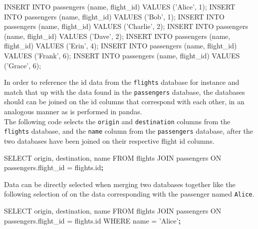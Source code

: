 \documentclass[]{book}
\newenvironment{Shaded}{\begin{snugshade}}{\end{snugshade}}
\newcommand{\ExtensionTok}[1]{#1}
\newcommand{\KeywordTok}[1]{\textcolor[rgb]{0.13,0.29,0.53}{\textbf{#1}}}
\newcommand{\NormalTok}[1]{#1}
\newcommand{\StringTok}[1]{\textcolor[rgb]{0.31,0.60,0.02}{#1}}
\begin{document}
\begin{Shaded}
\begin{Highlighting}[]
\ExtensionTok{INSERT}\NormalTok{ INTO passengers (name, flight_id) }\ExtensionTok{VALUES}\NormalTok{ (}\StringTok{'Alice'}\NormalTok{, 1);  }
\ExtensionTok{INSERT}\NormalTok{ INTO passengers (name, flight_id) }\ExtensionTok{VALUES}\NormalTok{ (}\StringTok{'Bob'}\NormalTok{, 1);    }
\ExtensionTok{INSERT}\NormalTok{ INTO passengers (name, flight_id) }\ExtensionTok{VALUES}\NormalTok{ (}\StringTok{'Charlie'}\NormalTok{, 2);}
\ExtensionTok{INSERT}\NormalTok{ INTO passengers (name, flight_id) }\ExtensionTok{VALUES}\NormalTok{ (}\StringTok{'Dave'}\NormalTok{, 2);   }
\ExtensionTok{INSERT}\NormalTok{ INTO passengers (name, flight_id) }\ExtensionTok{VALUES}\NormalTok{ (}\StringTok{'Erin'}\NormalTok{, 4);   }
\ExtensionTok{INSERT}\NormalTok{ INTO passengers (name, flight_id) }\ExtensionTok{VALUES}\NormalTok{ (}\StringTok{'Frank'}\NormalTok{, 6);  }
\ExtensionTok{INSERT}\NormalTok{ INTO passengers (name, flight_id) }\ExtensionTok{VALUES}\NormalTok{ (}\StringTok{'Grace'}\NormalTok{, 6);  }
\end{Highlighting}
\end{Shaded}

In order to reference the id data from the \texttt{flights} database for instance and match that up with the data found in the \texttt{passengers} database, the databases should can be joined on the id columns that correspond with each other, in an analogous manner as is performed in pandas.\\
The following code selects the \texttt{origin} and \texttt{destination} columns from the \texttt{flights} database, and the \texttt{name} column from the \texttt{passengers} database, after the two databases have been joined on their respective flight id columns.

\begin{Shaded}
\begin{Highlighting}[]
\ExtensionTok{SELECT}\NormalTok{ origin, destination, name FROM flights JOIN passengers ON passengers.flight_id = flights.id}\KeywordTok{;}
\end{Highlighting}
\end{Shaded}

Data can be directly selected when merging two databases together like the following selection of on the data corresponding with the passenger named \texttt{Alice}.

\begin{Shaded}
\begin{Highlighting}[]
\ExtensionTok{SELECT}\NormalTok{ origin, destination, name FROM flights JOIN passengers ON passengers.flight_id = flights.id WHERE name = }\StringTok{'Alice'}\KeywordTok{;}
\end{Highlighting}
\end{Shaded}
\end{document}
